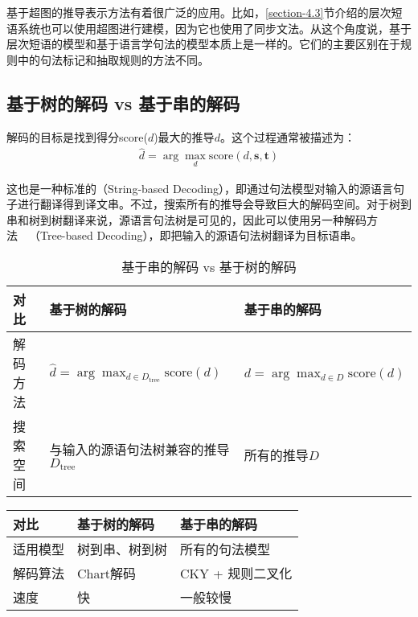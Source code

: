 \parinterval 基于超图的推导表示方法有着很广泛的应用。比如，\ref{section-4.3}节介绍的层次短语系统也可以使用超图进行建模，因为它也使用了同步文法。从这个角度说，基于层次短语的模型和基于语言学句法的模型本质上是一样的。它们的主要区别在于规则中的句法标记和抽取规则的方法不同。


\subsection{基于树的解码 vs 基于串的解码}

\parinterval 解码的目标是找到得分score($d$)最大的推导$d$。这个过程通常被描述为：
\begin{eqnarray}
\hat{d} = \arg\max_d \textrm{score} (d,\mathbf{s},\mathbf{t})
\label{eq:4-34}
\end{eqnarray}

\parinterval 这也是一种标准的{\small{}}（String-based Decoding），即通过句法模型对输入的源语言句子进行翻译得到译文串。不过，搜索所有的推导会导致巨大的解码空间。对于树到串和树到树翻译来说，源语言句法树是可见的，因此可以使用另一种解码方法\ \dash \ {\small{}}（Tree-based Decoding），即把输入的源语句法树翻译为目标语串。

\begin{table}[htp]{
\begin{center}
\caption{基于串的解码 vs 基于树的解码}
\label{tab:4-4}
{
\begin{tabular}{l | p{16.5em} l}
对比 & 基于树的解码 & 基于串的解码 \\
\hline
\rule{0pt}{15pt}解码方法 & $\hat{d} = \arg\max_{d \in D_{\textrm{tree}}} \textrm{score} (d)$ & $\hat{d} = \arg\max_{d \in D} \textrm{score} (d)$ \\
\rule{0pt}{15pt}搜索空间 & 与输入的源语句法树兼容的推导$D_{\textrm{tree}}$ & 所有的推导$D$ 
\end{tabular}
}
\end{center}
}\end{table}
\begin{table}[htp]{
\begin{center}
{
\begin{tabular}{l | p{16.5em} l}
对比 & 基于树的解码 & 基于串的解码 \\
\hline
\rule{0pt}{15pt}适用模型 & 树到串、树到树 & 所有的句法模型 \\
\rule{0pt}{15pt}解码算法 & Chart解码 & CKY + 规则二叉化 \\
\rule{0pt}{15pt}速度 & 快 & 一般较慢
\end{tabular}
}
\end{center}
}\end{table}

